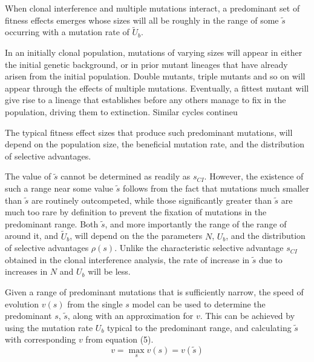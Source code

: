 \documentclass[12pt, two column]{article}
\begin{document}
When clonal interference and multiple mutations interact, a predominant set of fitness effects emerges whose sizes will all be roughly in the range of some $\tilde{s}$ occurring with a mutation rate of $\tilde{U}_b$.  


In an initially clonal population, mutations of varying sizes will appear in either the initial genetic background, or in prior mutant lineages that have already arisen from the initial population. Double mutants, triple mutants and so on will appear through the effects of multiple mutations.  Eventually, a fittest mutant will give rise to a lineage that establishes before any others manage to fix in the population, driving them to extinction.  Similar cycles contineu 


The typical fitness effect sizes that produce such predominant mutations, will depend on the population size, the beneficial mutation rate, and the distribution of selective advantages.  

The value of $\tilde{s}$ cannot be determined as readily as $s_{CI}$.  However, the existence of such a range near some value $\tilde{s}$ follows from the fact that mutations much smaller than $\tilde{s}$ are routinely outcompeted, while those significantly greater than $\tilde{s}$ are much too rare by definition to prevent the fixation of mutations in the predominant range.  Both $\tilde{s}$, and more importantly the range of the range of around it, and $\tilde{U}_b$, will depend on the the parameters $N$, $U_b$, and the distribution of selective advantages $\rho(s)$.  Unlike the characteristic selective advantage $s_{CI}$ obtained in the clonal interference analysis, the rate of increase in $\tilde{s}$ due to increases in $N$ and $U_b$ will be less.

Given a range of predominant mutations that is sufficiently narrow, the speed of evolution $v(s)$ from the single $s$ model can be used to determine the predominant $s$, $\tilde{s}$, along with an approximation for $v$.  This can be achieved by using the mutation rate $U_b$ typical to the predominant range, and calculating $\tilde{s}$ with corresponding $v$ from equation (5).
\begin{equation}
v = \max_{s} v(s)=v(\tilde{s})
\end{equation}
\end{document}
